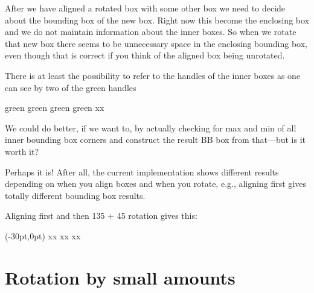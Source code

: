 \documentclass{article}
\newcommand\cbox[2][.8]{{\setlength\fboxsep{0pt}\colorbox[gray]{#1}{#2}}}
\begin{document}
After we have aligned a rotated box with some other box we need to decide about
the bounding box of the new box. Right now this become the enclosing box and
we do not maintain information about the inner boxes. So when we rotate that
new box there seems to be unnecessary space in the enclosing bounding box,
even though that is correct if you think of the aligned box being unrotated.

There is at least the possibility to refer to the handles of the inner boxes
as one can see by two of the green handles

\medskip

\rotatecoffin {}
\displaycoffinhandle {} {green}
\displaycoffinhandle {} {green}
\displaycoffinhandle {} {green}
\displaycoffinhandle {} {green}
x\cbox{\usebox \aaa }x

We could do better, if we want to, by actually checking for max and
min of all inner bounding box corners and construct the result BB box from
that---but is it worth it?

Perhaps it is! After all, the current implementation shows different results
depending on when you align boxes and when you rotate, e.g., aligning first
gives totally different bounding box results.

\newpage

Aligning first and then 135 + 45 rotation gives this:

\sbox {}
\sbox {}
\rotatecoffin {}

\aligncoffins \aaa [b,l] \bbb[B,hc](-30pt,0pt)
x\cbox{\usebox \aaa }x
\qquad
\rotatecoffin {}
x\cbox{\usebox \aaa }x
\qquad
\rotatecoffin {}
x\cbox{\usebox \aaa }x




\newpage

\section{Rotation by small amounts}
\end{document}

